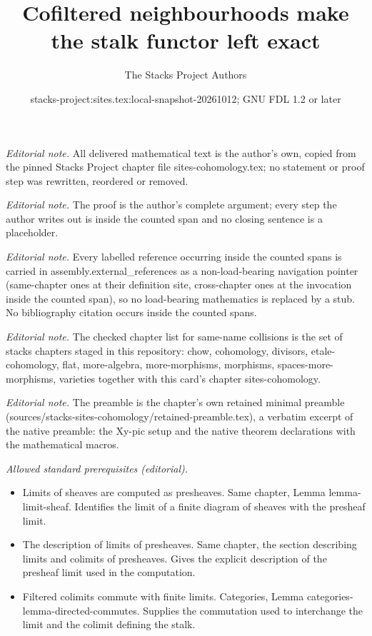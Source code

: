 \documentclass[10pt,a4paper]{amsart}
\title{Cofiltered neighbourhoods make the stalk functor left exact}
\author{The Stacks Project Authors}
\date{stacks-project:sites.tex:local-snapshot-20261012; GNU FDL 1.2 or later}
\theoremstyle{plain}
\theoremstyle{definition}
\theoremstyle{remark}
\numberwithin{equation}{subsection}
\begin{document}
\maketitle
\noindent\textit{Editorial note.} All delivered mathematical text is the author's own, copied from the pinned Stacks Project chapter file sites-cohomology.tex; no statement or proof step was rewritten, reordered or removed.\par\medskip
\noindent\textit{Editorial note.} The proof is the author's complete argument; every step the author writes out is inside the counted span and no closing sentence is a placeholder.\par\medskip
\noindent\textit{Editorial note.} Every labelled reference occurring inside the counted spans is carried in assembly.external\_references as a non-load-bearing navigation pointer (same-chapter ones at their definition site, cross-chapter ones at the invocation inside the counted span), so no load-bearing mathematics is replaced by a stub. No bibliography citation occurs inside the counted spans.\par\medskip
\noindent\textit{Editorial note.} The checked chapter list for same-name collisions is the set of stacks chapters staged in this repository: chow, cohomology, divisors, etale-cohomology, flat, more-algebra, more-morphisms, morphisms, spaces-more-morphisms, varieties together with this card's chapter sites-cohomology.\par\medskip
\noindent\textit{Editorial note.} The preamble is the chapter's own retained minimal preamble (sources/stacks-sites-cohomology/retained-preamble.tex), a verbatim excerpt of the native preamble: the Xy-pic setup and the native theorem declarations with the mathematical macros.\par\medskip
\noindent\textit{Allowed standard prerequisites (editorial).}\begin{itemize}
\item Limits of sheaves are computed as presheaves. Same chapter, Lemma lemma-limit-sheaf. Identifies the limit of a finite diagram of sheaves with the presheaf limit.
\item The description of limits of presheaves. Same chapter, the section describing limits and colimits of presheaves. Gives the explicit description of the presheaf limit used in the computation.
\item Filtered colimits commute with finite limits. Categories, Lemma categories-lemma-directed-commutes. Supplies the commutation used to interchange the limit and the colimit defining the stalk.
\end{itemize}\medskip
\end{document}
